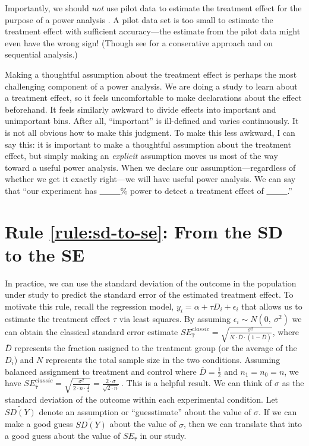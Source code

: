 \documentclass[12pt]{article}
\begin{document}
Importantly, we should \textit{not} use pilot data to estimate the treatment effect for the purpose of a power analysis \citep{Leon2011, Albers2018}.
A pilot data set is too small to estimate the treatment effect with sufficient accuracy---the estimate from the pilot data might even have the wrong sign! (Though see \citet{Perugini2014} for a conserative approach and \cite{Lakens2014} on sequential analysis.)

Making a thoughtful assumption about the treatment effect is perhaps the most challenging component of a power analysis. 
We are doing a study to learn about a treatment effect, so it feels uncomfortable to make declarations about the effect beforehand. 
It feels similarly awkward to divide effects into important and unimportant bins. 
After all, ``important'' is ill-defined and varies continuously. It is not all obvious how to make this judgment. 
To make this less awkward, I can say this: it is important to make a thoughtful assumption about the treatment effect, but simply making an  \emph{explicit} assumption moves us most of the way toward a useful power analysis. 
When we declare our assumption---regardless of whether we get it exactly right---we will have useful power analysis. 
We can say that ``our experiment has \underline{~~~~~}\% power to detect a treatment effect of \underline{~~~~~}.''

\section*{Rule \ref{rule:sd-to-se}: From the SD to the SE}

In practice, we can use the standard deviation of the outcome in the population under study to predict the standard error of the estimated treatment effect. 
To motivate this rule, recall the regression model, $y_{i} = \alpha + \tau D_{i} + \epsilon_{i}$ that allows us to estimate the treatment effect $\tau$ via least squares. 
By assuming $\epsilon_{i} \sim N\left( 0,\ \sigma^{2} \right)$ we can obtain the classical standard error estimate $SE_{\widehat{\tau}}^{classic} = \sqrt{\frac{\sigma^{2}}{N \cdot \overline{D} \cdot \left( 1 - \overline{D} \right)}}$, where $\overline{D}$ represents the fraction assigned to the treatment group (or the average of the $D_{i}$) and $N$ represents the total sample size in the two conditions. 
Assuming balanced assignment to treatment and control where $\overline{D} = \frac{1}{2}$ and $n_{1} = n_{0} = n$, we have $SE_{\widehat{\tau}}^{classic} = \sqrt{\frac{\sigma^{2}}{2 \cdot n \cdot \frac{1}{4}}} = \frac{2 \cdot \sigma}{\sqrt{2 \cdot n}}\ $.
This is a helpful result. 
We can think of $\sigma$ as the standard deviation of the outcome within each experimental condition. 
Let $\widetilde{SD(Y)}$ denote an assumption or ``guesstimate'' about the value of $\sigma$. 
If we can make a good guess $\widetilde{SD(Y)}$ about the value of $\sigma$, then we can translate that into a good guess about the value of $SE_{\widehat{\tau}}$ in our study.
\end{document}
